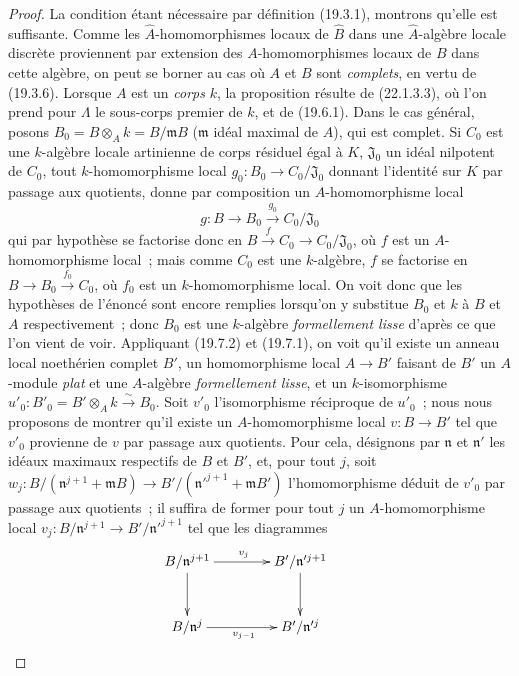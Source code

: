 \begin{proof}
La condition étant nécessaire par définition (19.3.1), montrons qu'elle est
suffisante. Comme les $\widehat A$-homomorphismes locaux de $\widehat B$ dans
une $\widehat A$-algèbre locale discrète proviennent par extension des
$A$-homomorphismes locaux de $B$ dans cette algèbre, on peut se borner au cas
où $A$ et $B$ sont \emph{complets}, en vertu de (19.3.6). Lorsque $A$ est un
\emph{corps} $k$, la proposition résulte de (22.1.3.3), où l'on prend pour
$\Lambda$ le sous-corps premier de $k$, et de (19.6.1).
Dans le cas général, posons $B_0=B\otimes_Ak=B/\mathfrak mB$
($\mathfrak m$ idéal maximal de $A$), qui est complet. Si $C_0$ est une
$k$-algèbre locale artinienne de corps résiduel égal à $K$, $\mathfrak J_0$
un idéal nilpotent de $C_0$, tout $k$-homomorphisme local
$g_0:B_0\to C_0/\mathfrak J_0$ donnant l'identité sur $K$ par passage aux
quotients, donne par composition un $A$-homomorphisme local
\[
  g:B\longrightarrow B_0\xrightarrow{g_0}C_0/\mathfrak J_0
\]
qui par hypothèse se factorise donc en
$B\xrightarrow{f}C_0\to C_0/\mathfrak J_0$, où $f$ est un
$A$-homomorphisme local~; mais comme $C_0$ est une $k$-algèbre, $f$ se
factorise en $B\to B_0\xrightarrow{f_0}C_0$, où $f_0$ est un
$k$-homomorphisme local. On voit donc que les hypothèses de l'énoncé sont
encore remplies lorsqu'on y substitue $B_0$ et $k$ à $B$ et $A$
respectivement~; donc $B_0$ est une $k$-algèbre \emph{formellement lisse}
d'après ce que l'on vient de voir.
Appliquant (19.7.2) et (19.7.1), on voit qu'il existe un anneau local
noethérien complet $B'$, un homomorphisme local $A\to B'$ faisant de $B'$ un
$A$-module \emph{plat} et une $A$-algèbre \emph{formellement lisse}, et un
$k$-isomorphisme
$u'_0:B'_0=B'\otimes_Ak\xrightarrow{\sim}B_0$.
Soit $v'_0$ l'isomorphisme réciproque de $u'_0$~; nous nous proposons de
montrer qu'il existe un $A$-homomorphisme local $v:B\to B'$ tel que $v'_0$
provienne de $v$ par passage aux quotients. Pour cela, désignons par
$\mathfrak n$ et $\mathfrak n'$ les idéaux maximaux respectifs de $B$ et
$B'$, et, pour tout $j$, soit
$w_j:B/(\mathfrak n^{j+1}+\mathfrak mB)\to B'/(\mathfrak n'^{j+1}+\mathfrak mB')$
l'homomorphisme déduit de $v'_0$ par passage aux quotients~; il suffira de
former pour tout $j$ un $A$-homomorphisme local
$v_j:B/\mathfrak n^{j+1}\to B'/\mathfrak n'^{j+1}$ tel que les diagrammes
\[
\xymatrix@C=4em@R=3em{
  B/\mathfrak n^{j+1} \ar[r]^{v_j} \ar[d] &
  B'/\mathfrak n'^{j+1} \ar[d] \\
  B/\mathfrak n^j \ar[r]_{v_{j-1}} & B'/\mathfrak n'^j
}
\qquad
\]
\end{proof}
